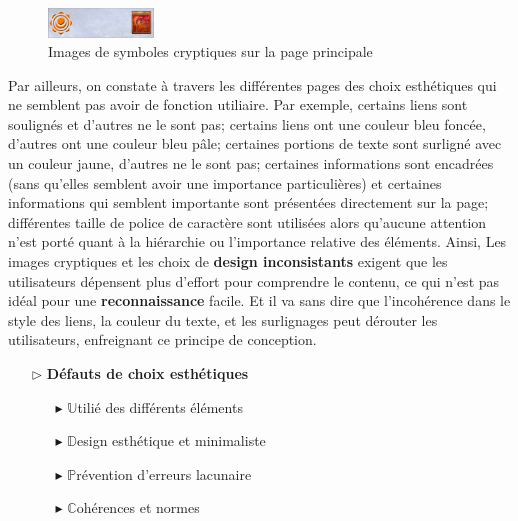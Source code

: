 \documentclass[9pt]{report}
\begin{document}
\begin{multicols*}{2}
  \begin{figure}[H]
    \begin{center}
      \includegraphics[width=0.25\textwidth]{ImageConfondantes2.png}
    \end{center}
    \vspace{-1em}
    \caption{Images de symboles cryptiques sur la page principale}
  \end{figure}

  Par ailleurs, on constate à travers les différentes pages 
  des choix esthétiques qui ne semblent pas avoir de fonction utiliaire. 
  Par exemple, certains liens sont soulignés et d'autres ne le sont pas; 
  certains liens ont une couleur bleu foncée, d'autres ont une couleur bleu pâle; 
  certaines portions de texte sont surligné avec un couleur jaune, d'autres ne le sont pas; 
  certaines informations sont encadrées (sans qu'elles semblent avoir une importance 
  particulières) et certaines informations qui semblent importante sont présentées 
  directement sur la page; différentes taille de police de caractère sont utilisées 
  alors qu'aucune  attention n'est porté quant à la hiérarchie 
  ou l'importance relative des éléments. Ainsi, 
  Les images cryptiques et les choix de \textbf{design inconsistants}
  exigent que les utilisateurs
  dépensent plus d'effort pour comprendre le contenu, ce qui n'est pas 
  idéal pour une \textbf{reconnaissance} facile. Et il va 
  sans dire que  l'incohérence dans le style des liens, la couleur du texte, 
  et les surlignages peut dérouter les utilisateurs, 
  enfreignant ce principe de conception.

  \begin{itemize}
    \item [$\rhd$ ] \textbf{Défauts de choix esthétiques}  
      \begin{itemize}
        \item [$\blacktriangleright$ ] $\mathbb{U}$tilié des différents éléments 
        \item [$\blacktriangleright$ ] $\mathbb{D}$esign esthétique et minimaliste 
        \item [$\blacktriangleright$ ] $\mathbb{P}$révention d'erreurs lacunaire
        \item [$\blacktriangleright$ ] $\mathbb{C}$ohérences et normes
      \end{itemize}
  \end{itemize}



\end{multicols*}
\end{document}
